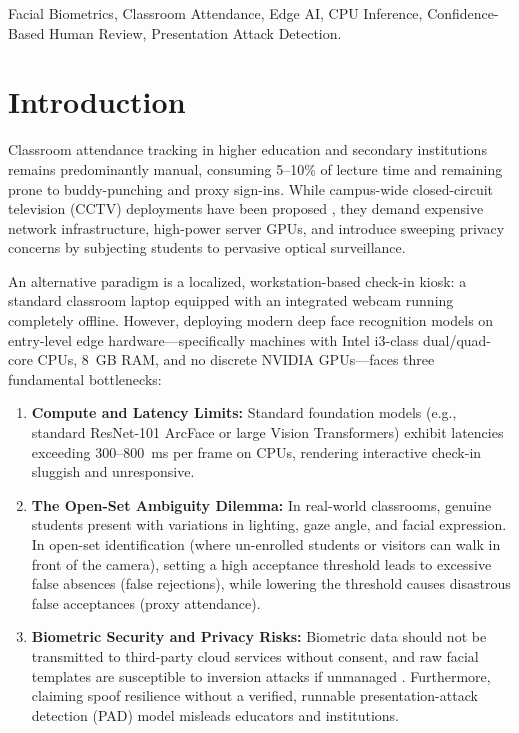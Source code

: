 \documentclass[conference]{IEEEtran}
\begin{document}
\begin{IEEEkeywords}
Facial Biometrics, Classroom Attendance, Edge AI, CPU Inference, Confidence-Based Human Review, Presentation Attack Detection.
\end{IEEEkeywords}

\section{Introduction}
Classroom attendance tracking in higher education and secondary institutions remains predominantly manual, consuming 5--10\% of lecture time and remaining prone to buddy-punching and proxy sign-ins. While campus-wide closed-circuit television (CCTV) deployments have been proposed \cite{patel2025cctv}, they demand expensive network infrastructure, high-power server GPUs, and introduce sweeping privacy concerns by subjecting students to pervasive optical surveillance.

An alternative paradigm is a localized, workstation-based check-in kiosk: a standard classroom laptop equipped with an integrated webcam running completely offline. However, deploying modern deep face recognition models on entry-level edge hardware---specifically machines with Intel i3-class dual/quad-core CPUs, 8~GB RAM, and no discrete NVIDIA GPUs---faces three fundamental bottlenecks:
\begin{enumerate}
    \item \textbf{Compute and Latency Limits:} Standard foundation models (e.g., standard ResNet-101 ArcFace or large Vision Transformers) exhibit latencies exceeding 300--800~ms per frame on CPUs, rendering interactive check-in sluggish and unresponsive.
    \item \textbf{The Open-Set Ambiguity Dilemma:} In real-world classrooms, genuine students present with variations in lighting, gaze angle, and facial expression. In open-set identification (where un-enrolled students or visitors can walk in front of the camera), setting a high acceptance threshold leads to excessive false absences (false rejections), while lowering the threshold causes disastrous false acceptances (proxy attendance).
    \item \textbf{Biometric Security and Privacy Risks:} Biometric data should not be transmitted to third-party cloud services without consent, and raw facial templates are susceptible to inversion attacks if unmanaged \cite{sun2025privacy}. Furthermore, claiming spoof resilience without a verified, runnable presentation-attack detection (PAD) model misleads educators and institutions.
\end{enumerate}
\end{document}
